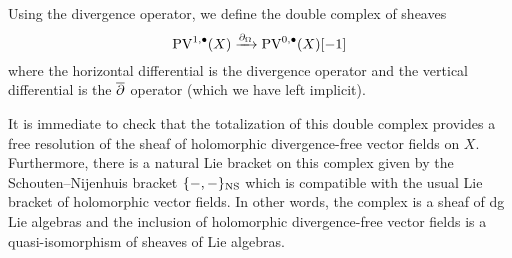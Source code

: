 \documentclass[11pt]{amsart}
\def\pv{{\rm PV}}
\def\PV{{\rm PV}}
\begin{document}
Using the divergence operator, we define the double complex of sheaves
\begin{equation}\label{eqn:div}
\PV^{1,\bu}(X) \xto{\partial_\Omega} \PV^{0,\bu}(X) [-1] 
\end{equation}
where the horizontal differential is the divergence operator and the vertical differential is the $\overline{\partial}$ operator (which we have left implicit). 

It is immediate to check that the totalization of this double complex provides a free resolution of the sheaf of holomorphic divergence-free vector fields on $X$.
Furthermore, there is a natural Lie bracket on this complex given by the Schouten--Nijenhuis bracket $\{-,-\}_{\rm NS}$ which is compatible with the usual Lie bracket of holomorphic vector fields. 
In other words, the complex is a sheaf of dg Lie algebras and the inclusion of holomorphic divergence-free vector fields is a quasi-isomorphism of sheaves of Lie algebras.








\end{document}
